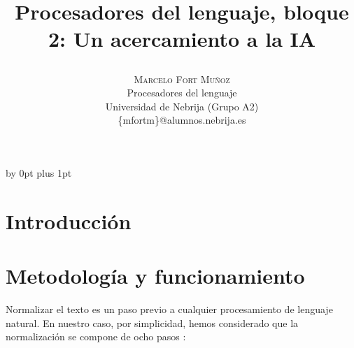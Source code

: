 \documentclass[a4paper,twocolumn]{article}
\title{
    \begin{center}
        \huge\bfseries Procesadores del lenguaje, bloque 2: Un acercamiento a la IA
    \end{center}
} %
\author{%
    \begin{center}
        \large\centering\textsc{Marcelo Fort Muñoz} \\[1ex] %
        \normalsize Procesadores del lenguaje \\[0.25ex]
        \normalsize Universidad de Nebrija (Grupo A2) \\[0.25ex] %
        \normalsize \{mfortm\}@alumnos.nebrija.es %
    \end{center}
}
\date{\begin{center}
          \large\today\\[2.5ex]
\end{center}} %
\begin{document}
    \maketitle

    \baselineskip \advance\parskip by 0pt plus 1pt


    \section{Introducción}\label{sec:introduccion}


    \section{Metodología y funcionamiento}\label{sec:metodologia-y-funcionamiento}
    Normalizar el texto es un paso previo a cualquier procesamiento de lenguaje natural.
    En nuestro caso, por simplicidad, hemos considerado que la normalización se compone de ocho pasos \cite{enunciado}:
\end{document}

